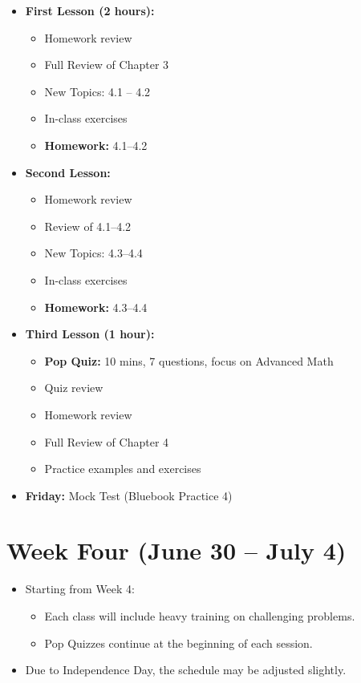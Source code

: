 \documentclass{article}
\begin{document}
\begin{itemize}[leftmargin=*]
    \item \textbf{First Lesson (2 hours):}
    \begin{itemize}
        \item Homework review
        \item Full Review of Chapter 3
        \item New Topics: 4.1 -- 4.2
        \item In-class exercises
        \item \textbf{Homework:} 4.1--4.2
    \end{itemize}
    \item \textbf{Second Lesson:}
    \begin{itemize}
        \item Homework review
        \item Review of 4.1--4.2
        \item New Topics: 4.3--4.4
        \item In-class exercises
        \item \textbf{Homework:} 4.3--4.4
    \end{itemize}
    \item \textbf{Third Lesson (1 hour):}
    \begin{itemize}
        \item \textbf{Pop Quiz:} 10 mins, 7 questions, focus on Advanced Math
        \item Quiz review
        \item Homework review
        \item Full Review of Chapter 4
        \item Practice examples and exercises
    \end{itemize}
    \item \textbf{Friday:} Mock Test (Bluebook Practice 4)
\end{itemize}

\newpage

\section*{Week Four (June 30 -- July 4)}

\begin{itemize}[leftmargin=*]
    \item Starting from Week 4:
    \begin{itemize}
        \item Each class will include heavy training on challenging problems.
        \item Pop Quizzes continue at the beginning of each session.
    \end{itemize}
    \item Due to Independence Day, the schedule may be adjusted slightly.
\end{itemize}
\end{document}
